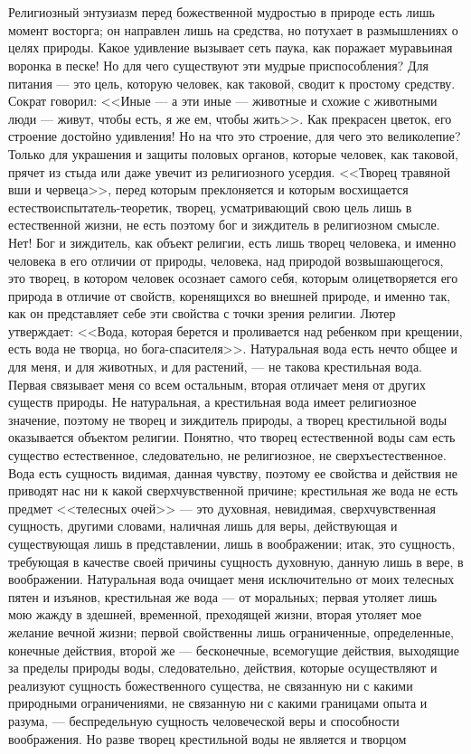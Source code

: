 \documentclass[12pt,oneside]{book}
\begin{document}
\chapter{}

Религиозный энтузиазм перед божественной мудростью в природе есть лишь момент восторга; он направлен лишь на средства, но потухает в размышлениях о целях природы. Какое удивление вызывает сеть паука, как поражает муравьиная воронка в песке! Но для чего существуют эти мудрые приспособления? Для питания --- это цель, которую человек, как таковой, сводит к простому средству. Сократ говорил: <<Иные --- а эти иные --- животные и схожие с животными люди --- живут, чтобы есть, я же ем, чтобы жить>>. Как прекрасен цветок, его строение достойно удивления! Но на что это строение, для чего это великолепие? Только для украшения и защиты половых органов, которые человек, как таковой, прячет из стыда или даже увечит из религиозного усердия. <<Творец травяной вши и червеца>>, перед которым преклоняется и которым восхищается естествоиспытатель-теоретик, творец, усматривающий свою цель лишь в естественной жизни, не есть поэтому бог и зиждитель в религиозном смысле. Нет! Бог и зиждитель, как объект религии, есть лишь творец человека, и именно человека в его отличии от природы, человека, над природой возвышающегося, это творец, в котором человек осознает самого себя, которым олицетворяется его природа в отличие от свойств, коренящихся во внешней природе, и именно так, как он представляет себе эти свойства с точки зрения религии. Лютер утверждает: <<Вода, которая берется и проливается над ребенком при крещении, есть вода не творца, но бога-спасителя>>. Натуральная вода есть нечто общее и для меня, и для животных, и для растений, --- не такова крестильная вода. Первая связывает меня со всем остальным, вторая отличает меня от других существ природы. Не натуральная, а крестильная вода имеет религиозное значение, поэтому не творец и зиждитель природы, а творец крестильной воды оказывается объектом религии. Понятно, что творец естественной воды сам есть существо естественное, следовательно, не религиозное, не сверхъестественное. Вода есть сущность видимая, данная чувству, поэтому ее свойства и действия не приводят нас ни к какой сверхчувственной причине; крестильная же вода не есть предмет <<телесных очей>> --- это духовная, невидимая, сверхчувственная сущность, другими словами, наличная лишь для веры, действующая и существующая лишь в представлении, лишь в воображении; итак, это сущность, требующая в качестве своей причины сущность духовную, данную лишь в вере, в воображении. Натуральная вода очищает меня исключительно от моих телесных пятен и изъянов, крестильная же вода --- от моральных; первая утоляет лишь мою жажду в здешней, временной, преходящей жизни, вторая утоляет мое желание вечной жизни; первой свойственны лишь ограниченные, определенные, конечные действия, второй же --- бесконечные, всемогущие действия, выходящие за пределы природы воды, следовательно, действия, которые осуществляют и реализуют сущность божественного существа, не связанную ни с какими природными ограничениями, не связанную ни с какими границами опыта и разума, --- беспредельную сущность человеческой веры и способности воображения. Но разве творец крестильной воды не является и творцом 
\end{document}

